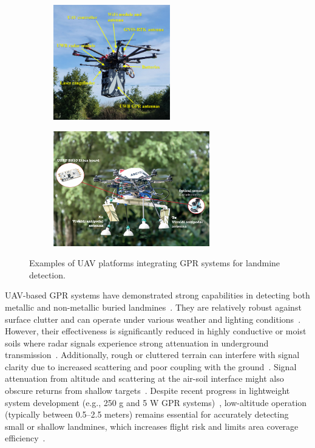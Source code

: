 \begin{figure}[h!]
    \centering
    \begin{subfigure}[b]{0.48\linewidth}
        \centering
        \includegraphics[height=5cm]{figs/Huirui/gpr_drone1.png}
        \label{fig:gpr_drone1}
    \end{subfigure}
    \hfill
    \begin{subfigure}[b]{0.48\linewidth}
        \centering
        \includegraphics[height=5cm]{figs/Huirui/gpr_drone2.png}
        \label{fig:gpr_drone2}
    \end{subfigure}
    \caption{Examples of UAV platforms integrating GPR systems for landmine detection.~\cite{garcia2022safedrone,cerquera2017uav}}
    \label{fig:gpr_uav_examples}
\end{figure}

UAV-based GPR systems have demonstrated strong capabilities in detecting both metallic and non-metallic buried landmines~\cite{vsipovs2020lightweight,colorado2017integrated}. They are relatively robust against surface clutter and can operate under various weather and lighting conditions~\cite{noviello2022overview}. However, their effectiveness is significantly reduced in highly conductive or moist soils where radar signals experience strong attenuation in underground transmission~\cite{lee2023modeling}. Additionally, rough or cluttered terrain can interfere with signal clarity due to increased scattering and poor coupling with the ground~\cite{yoo2021application}. Signal attenuation from altitude and scattering at the air-soil interface might also obscure returns from shallow targets~\cite{garcia2019autonomous}. Despite recent progress in lightweight system development (e.g., 250 g and 5 W GPR systems)~\cite{colorado2017integrated}, low-altitude operation (typically between 0.5--2.5 meters) remains essential for accurately detecting small or shallow landmines, which increases flight risk and limits area coverage efficiency~\cite{vsipovs2020lightweight,colorado2017integrated,fernandez2021development}.



